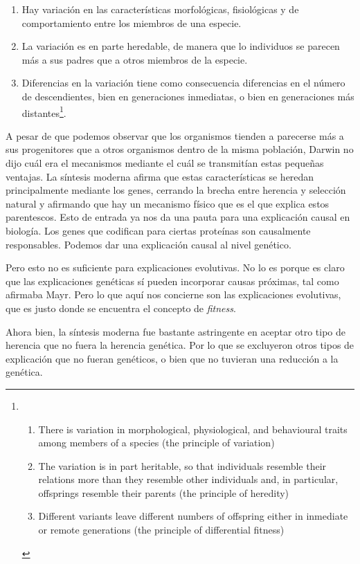 \begin{enumerate}
  \item Hay variación en las características morfológicas, fisiológicas y de comportamiento entre los miembros de una especie.
  \item La variación es en parte heredable, de manera que lo individuos se parecen más a sus padres que a otros miembros de la especie.
  \item Diferencias en la variación tiene como consecuencia diferencias en el número de descendientes, bien en generaciones inmediatas, o bien en generaciones más distantes\footnote{
  \begin{enumerate}
    \item There is variation in morphological, physiological, and behavioural traits among members of a species (the principle of variation)
    \item The variation is in part heritable, so that individuals resemble their relations more than they resemble other individuals and, in particular, offsprings resemble their parents (the principle of heredity)
    \item Different variants leave different numbers of offspring either in inmediate or remote generations (the principle of differential fitness)
  \end{enumerate}
  }\cite{Godfrey-Smith2013}.
\end{enumerate}

A pesar de que podemos observar que los organismos tienden a parecerse más a sus progenitores que a otros organismos dentro de la misma población, Darwin no dijo cuál era el mecanismos mediante el cuál se transmitían estas pequeñas ventajas. La síntesis moderna afirma que estas características se heredan principalmente mediante los genes, cerrando la brecha entre herencia y selección natural y afirmando que hay un mecanismo físico que es el que explica estos parentescos. Esto de entrada ya nos da una pauta para una explicación causal en biología. Los genes que codifican para ciertas proteínas son causalmente responsables. Podemos dar una explicación causal al nivel genético.

Pero esto no es suficiente para explicaciones evolutivas. No lo es porque es claro que las explicaciones genéticas sí pueden incorporar causas próximas, tal como afirmaba Mayr. Pero lo que aquí nos concierne son las explicaciones evolutivas, que es justo donde se encuentra el concepto de \emph{fitness}.

Ahora bien, la síntesis moderna fue bastante astringente en aceptar otro tipo de herencia que no fuera la herencia genética. Por lo que se excluyeron otros tipos de explicación que no fueran genéticos, o bien que no tuvieran una reducción a la genética.

